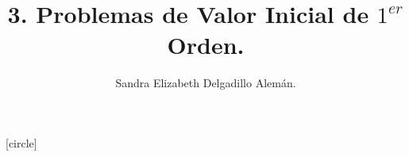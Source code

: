 
\title{3. Problemas de Valor Inicial de \(1^{er}\) Orden.}
\author{Sandra Elizabeth Delgadillo Alemán.}

\usepackage{tikz}
\usepackage{wasysym}
[circle] %

\newcommand\Myref[1]{%
  \begingroup
  \usebeamerfont*{item projected}%
  \usebeamercolor[bg]{item projected}%
  \begin{pgfpicture}{-1ex}{0ex}{1ex}{2ex}
    \pgfpathcircle{\pgfpoint{0pt}{.75ex}}{1.2ex}
    \pgfusepath{fill}
    \pgftext[base]{\color{fg}\ref{#1}}
  \end{pgfpicture}%
  \endgroup
}
\newcommand{\vectorcito}[3]{
	\fill [#1, scale=0.5] (#2) circle (3pt);
	\draw [semithick,#1,->, scale=0.5] (#2) --++ (0.7,0.7*#3);
} 
\newcommand{\estabilidad}[5]{
	\fill [white] (#1) circle (2pt);
	\node [#5] at (#1) {\tiny #2};
	\node [#5, #4] at (#1) {\tiny #3};
	} 
